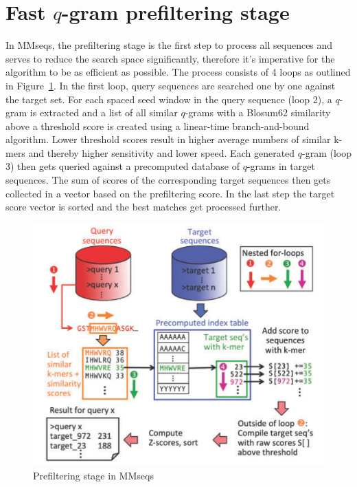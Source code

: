 \documentclass[twoside,a4paper,bsc]{master}
\newcommand{\Qgram}[1]{\(#1\)-gram}
\begin{document}
\section{Fast \Qgram{q} prefiltering stage}
In MMseqs, the prefiltering stage is the first step to process all
sequences and serves to reduce the search space significantly, therefore
it's imperative for the algorithm to be as efficient as possible. The
process consists of 4 loops as outlined in
Figure~\ref{fig:prefilterMMseqs}. In the first loop, query sequences are
searched one by one against the target set. For each spaced seed window in
the query sequence (loop 2), a \Qgram{q} is extracted and a list of all
similar \Qgram{q}s with a Blosum62 similarity above a threshold score is
created using a linear-time branch-and-bound algorithm. Lower threshold
scores result in higher average numbers of similar k-mers and thereby
higher sensitivity and lower speed. Each generated \Qgram{q} (loop 3) then
gets queried against a precomputed database of \Qgram{q}s in target
sequences. The sum of scores of the corresponding target sequences then
gets collected in a vector based on the prefiltering score. In the last
step the target score vector is sorted and the best matches get processed
further.
\begin{figure}[t]
\begin{center}
\includegraphics[scale=0.3]{graphics/MMseqs_prefilter.png}
\end{center}
\caption{Prefiltering stage in MMseqs~\cite{hauser2014mmseqs}}
\label{fig:prefilterMMseqs}
\end{figure}
\end{document}
